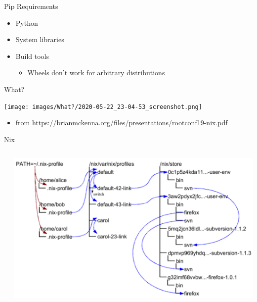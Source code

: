\documentclass[bigger,unknownkeysallowed,aspectratio=169,colorblocks]{beamer}
\begin{document}
\begin{frame}[label={sec:orgaa53f83}]{Pip Requirements}
\begin{itemize}
\item Python
\item System libraries
\item Build tools
\begin{itemize}
\item Wheels don't work for arbitrary distributions
\end{itemize}
\end{itemize}
\end{frame}
\begin{frame}[label={sec:orgd496c8b}]{What?}
\begin{center}
\texttt{[image: images/What?/2020-05-22\_23-04-53\_screenshot.png]}
\end{center}
\begin{itemize}
\item \tiny from \url{https://brianmckenna.org/files/presentations/rootconf19-nix.pdf}
\end{itemize}
\end{frame}
\begin{frame}[label={sec:org50be56b}]{Nix}
\begin{columns}
\begin{column}{0.4\columnwidth}
\end{column}
\begin{column}{0.6\columnwidth}
\begin{center}
\includegraphics[width=.9\linewidth]{images/A_screenshot/2020-05-22_23-15-22_screenshot.png}
\end{center}
\end{column}
\end{columns}
\end{frame}
\end{document}
